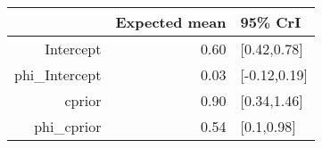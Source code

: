 \begin{tabular}{rrl}
  \hline
 & Expected mean & 95\% CrI \\ 
  \hline
Intercept & 0.60 & [0.42,0.78] \\ 
  phi\_Intercept & 0.03 & [-0.12,0.19] \\ 
  cprior & 0.90 & [0.34,1.46] \\ 
  phi\_cprior & 0.54 & [0.1,0.98] \\ 
   \hline
\end{tabular}

